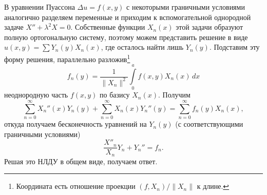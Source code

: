 В уравнении Пуассона $ \Delta u = f(x, y) $ с некоторыми граничными условиями
аналогично разделяем переменные и приходим к вспомогательной однородной задаче
$ X'' + \lambda^2 X = 0 $. Собственные функции $ X_n(x) $ этой задачи образуют
полную ортогональную систему, поэтому можем представить решение в виде $ u(x,
y)= \sum Y_n(y) X_n(x) $, где осталось найти лишь $ Y_n(y) $. Подставим эту
форму решения, параллельно разложив\footnote{Координата есть отношение проекции
$ (f, X_n)/\|X_n\| $ к длине.}
\[
  f_n(y) = \frac{1}{\|X_n\|^2} \int\limits_{0}^{a}
  f(x, y) X_n(x)\,dx
\]
неоднородную часть $ f(x, y) $ по базису $ X_n(x) $. Получим  
\[
  \sum_{n=0}^\infty X_n''(x)Y_n(y) + \sum_{n=0}^\infty X_n(x)Y_n''(y) =
  \sum_{n=0}^\infty f_n(y)X_n(x),
\]
откуда получаем бесконечность уравнений на $ Y_n(y) $ (с соответствующими граничными условиями)
\[
  \frac{X''_n}{X_n} Y_n + Y_n'' = f_n.
\]
Решая это НЛДУ в общем виде, получаем ответ.


